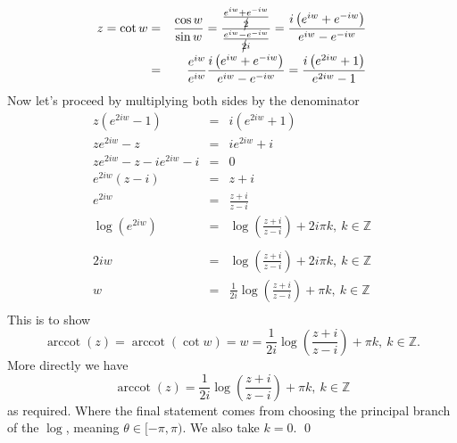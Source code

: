 \documentclass[10pt]{amsart}
\theoremstyle{nonumberplain}
\begin{document}
\begin{enumerate}[label={\bf {\arabic*}:}]
\begin{eqnarray*}
z = \cot w &=& \frac{\cos w}{\sin w} = \frac{ \frac{e^{iw} + e^{-iw}}{\cancel{2}} }{ \frac{e^{iw} - e^{-iw}}{\cancel{2}i} } = \frac{ i\left(e^{iw} + e^{-iw} \right)}{ e^{iw} - e^{-iw} } \\
	  &=& \frac{e^{iw}}{e^{iw}} \frac{ i\left(e^{iw} + e^{-iw} \right)}{ e^{iw} - e^{-iw} } = \frac{ i\left(e^{2iw} + 1 \right)}{ e^{2iw} - 1 }
\end{eqnarray*}
Now let's proceed by multiplying both sides by the denominator
\begin{eqnarray*}
z(e^{2iw} - 1) &=& i\left(e^{2iw} + 1 \right) \\
ze^{2iw} - z &=& ie^{2iw} + i \\
ze^{2iw} - z - ie^{2iw} - i &=& 0 \\
e^{2iw}(z - i) &=& z + i \\ 
e^{2iw} &=& \frac{z + i}{z - i} \\
\log \left(e^{2iw}\right) &=& \log \left(\frac{z + i}{z - i} \right) + 2i\pi k, \: k \in \mathbb{Z} \\ \\
2iw &=& \log \left(\frac{z + i}{z - i} \right) + 2i\pi k, \: k \in \mathbb{Z} \\
w &=& \frac{1}{2i}\log \left(\frac{z + i}{z - i} \right) + \pi k, \: k \in \mathbb{Z} \\
\end{eqnarray*}
This is to show
$$\operatorname{arccot}(z) = \operatorname{arccot}(\cot w) = w = \frac{1}{2i}\log \left(\frac{z + i}{z - i} \right) + \pi k, \: k \in \mathbb{Z}.$$
More directly we have 
$$ \operatorname{arccot}(z) = \frac{1}{2i}\log \left(\frac{z + i}{z - i} \right) + \pi k, \: k \in \mathbb{Z}$$
as required. 
Where the final statement comes from choosing the principal branch of the $\log$, meaning $\theta \in [-\pi, \pi)$.
We also take $k = 0$.
\qed
\\


\end{enumerate}
\end{document}

